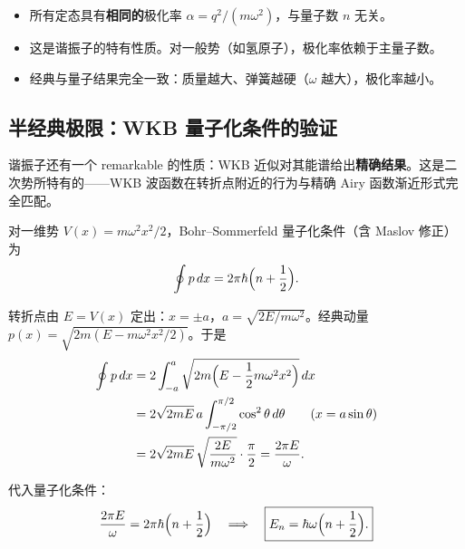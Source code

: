 \begin{formulabox}[极化率的关键结论]
\begin{itemize}[nosep]
\item 所有定态具有\textbf{相同的}极化率 $\alpha = q^2/(m\omega^2)$，与量子数 $n$ 无关。
\item 这是谐振子的特有性质。对一般势（如氢原子），极化率依赖于主量子数。
\item 经典与量子结果完全一致：质量越大、弹簧越硬（$\omega$ 越大），极化率越小。
\end{itemize}
\end{formulabox}

\subsection{半经典极限：WKB 量子化条件的验证}

谐振子还有一个 remarkable 的性质：WKB 近似对其能谱给出\textbf{精确结果}。这是二次势所特有的——WKB 波函数在转折点附近的行为与精确 Airy 函数渐近形式完全匹配。

对一维势 $V(x)=m\omega^2x^2/2$，Bohr--Sommerfeld 量子化条件（含 Maslov 修正）为
\begin{equation}
\oint p\,dx = 2\pi\hbar\Bigl(n + \frac12\Bigr).
\end{equation}

转折点由 $E=V(x)$ 定出：$x=\pm a$，$a=\sqrt{2E/m\omega^2}$。经典动量 $p(x)=\sqrt{2m(E-m\omega^2x^2/2)}$。于是
\begin{align*}
\oint p\,dx &= 2\int_{-a}^{a}\sqrt{2m\Bigl(E - \frac12m\omega^2x^2\Bigr)}\,dx \\
&= 2\sqrt{2mE}\,a\int_{-\pi/2}^{\pi/2}\cos^2\theta\,d\theta
\qquad (x = a\sin\theta) \\
&= 2\sqrt{2mE}\,\sqrt{\frac{2E}{m\omega^2}}\cdot\frac{\pi}{2}
= \frac{2\pi E}{\omega}.
\end{align*}

代入量子化条件：
\[
\frac{2\pi E}{\omega} = 2\pi\hbar\Bigl(n + \frac12\Bigr)
\quad\Longrightarrow\quad
\boxed{E_n = \hbar\omega\Bigl(n + \frac12\Bigr).}
\]

